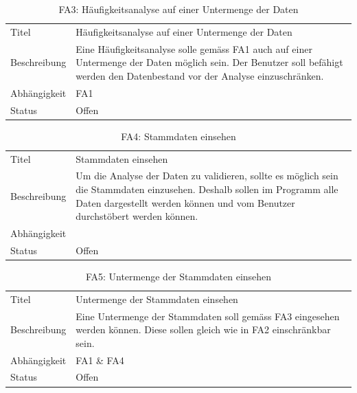 \begin{table}[H] 
	\caption{FA3: Häufigkeitsanalyse auf einer Untermenge der Daten}
	\centering
	\label{fig:anforderungsanalyse:funktionaleanforderung:fa3}
	\begin{tabular}{ | l | L{10cm} | } 
		\hline 
		 \\ \hline 
		Titel & Häufigkeitsanalyse auf einer Untermenge der Daten \\ \hline 
		Beschreibung & Eine Häufigkeitsanalyse solle gemäss FA1 auch auf einer Untermenge der Daten möglich sein. Der Benutzer soll befähigt werden den Datenbestand vor der Analyse einzuschränken. \\ \hline 
		Abhängigkeit & FA1 \\ \hline 
		Status & Offen \\ \hline 
	\end{tabular}
\end{table}

\begin{table}[H] 
	\caption{FA4: Stammdaten einsehen}
	\centering
	\label{fig:anforderungsanalyse:funktionaleanforderung:fa4}
	\begin{tabular}{ | l | L{10cm} | } 
		\hline 
		 \\ \hline 
		Titel & Stammdaten einsehen \\ \hline 
		Beschreibung & Um die Analyse der Daten zu validieren, sollte es möglich sein die Stammdaten einzusehen. Deshalb sollen im Programm alle Daten dargestellt werden können und vom Benutzer durchstöbert werden können. \\ \hline 
		Abhängigkeit & \\ \hline 
		Status & Offen \\ \hline 
	\end{tabular}
\end{table}

\begin{table}[H] 
	\caption{FA5: Untermenge der Stammdaten einsehen}
	\centering
	\label{fig:anforderungsanalyse:funktionaleanforderung:fa5}
	\begin{tabular}{ | l | L{10cm} | } 
		\hline 
		 \\ \hline 
		Titel & Untermenge der Stammdaten einsehen \\ \hline 
		Beschreibung & Eine Untermenge der Stammdaten soll gemäss FA3 eingesehen werden können. Diese sollen gleich wie in FA2 einschränkbar sein.  \\ \hline 
		Abhängigkeit & FA1 \& FA4 \\ \hline 
		Status & Offen \\ \hline 
	\end{tabular}
\end{table}

